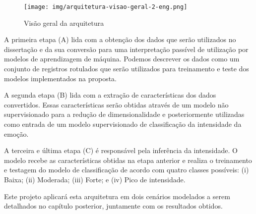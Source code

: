 \begin{figure}[]
\centering
\texttt{[image: img/arquitetura-visao-geral-2-eng.png]}
\caption{\label{fig:visaogeralproposta}Visão geral da arquitetura}
\end{figure}

A primeira etapa (A) lida com a obtenção dos dados que serão utilizados no dissertação e da sua conversão para uma interpretação passível de utilização por modelos de aprendizagem de máquina. Podemos descrever os dados como um conjunto de registros rotulados que serão utilizados para treinamento e teste dos modelos implementados na proposta.

A segunda etapa (B) lida com a extração de características dos dados convertidos. Essas características serão obtidas através de um modelo não supervisionado para a redução de dimensionalidade e posteriormente utilizadas como entrada de um modelo supervisionado de classificação da intensidade da emoção.

A terceira e última etapa (C) é responsável pela inferência da intensidade. O modelo recebe as características obtidas na etapa anterior e realiza o treinamento e testagem do modelo de classificação de acordo com quatro classes possíveis: (i) Baixa; (ii) Moderada; (iii) Forte; e (iv) Pico de intensidade.

Este projeto aplicará esta arquitetura em dois cenários modelados a serem detalhados no capítulo posterior, juntamente com os resultados obtidos.




